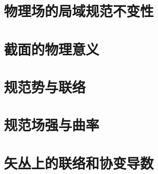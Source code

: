 \section{物理场的局域规范不变性}

\section{截面的物理意义}

\section{规范势与联络}

\section{规范场强与曲率}

\section{矢丛上的联络和协变导数}
